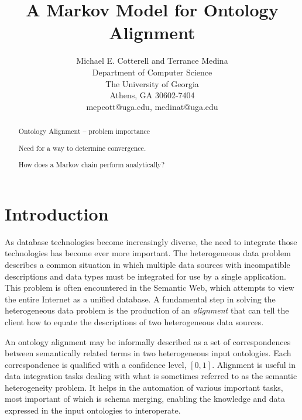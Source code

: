 \documentclass[letterpaper,twocolumn,12pt]{article}
\begin{document}
\newtheorem{defn}{Definition}

\title{A Markov Model for Ontology Alignment}

\author{Michael E. Cotterell and Terrance Medina \\
Department of Computer Science \\
The University of Georgia \\
Athens, GA 30602-7404 \\
mepcott@uga.edu, medinat@uga.edu
}

\maketitle

\begin{abstract}
Ontology Alignment -- problem importance

Need for a way to determine convergence.

How does a Markov chain perform analytically?

\end{abstract}


\section{Introduction}


As database technologies become increasingly diverse, the need to integrate those technologies has become ever more important. 
The heterogeneous data problem describes a common situation in which multiple data sources with incompatible descriptions and data types must be integrated for use by a single application. 
This problem is often encountered in the Semantic Web, which attempts to view the entire Internet as a unified database. 
A fundamental step in solving the heterogeneous data problem is the production of an \textit{alignment} that can tell the client how to equate the descriptions of two heterogeneous data sources.

An ontology alignment may be informally described as a set of correspondences between semantically related terms in two heterogeneous input ontologies. 
Each correspondence is qualified with a confidence level, $[0,1]$.
Alignment is useful in data integration tasks dealing with what is sometimes referred to as the semantic heterogeneity problem. 
It helps in the automation of various important tasks, most important of which is schema merging, enabling the knowledge and data expressed in the input ontologies to interoperate.
\end{document}
